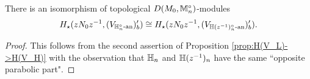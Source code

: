 \documentclass[10pt]{amsart}
\begin{document}
\begin{proposition}\label{prop:Hecke_isom}
There is an isomorphism of topological $D(M_{0},\mathbb{M}_{n}^{\circ})$-modules \[
    H_{\star}(zN_{0}z^{-1},(V_{\mathbb{H}_{n}^{\circ}\textnormal{-an}})^{\prime}_{b}) \cong H_{\star}(zN_{0}z^{-1},(V_{\mathbb{H}(z^{-1})_{n}^{\circ}\textnormal{-an}})^{\prime}_{b}).
\]
\end{proposition}
\begin{proof}
This follows from the second assertion of Proposition \ref{prop:H(V_L)->H(V_H)} with the observation that $\mathbb{H}_{n}$ and $\mathbb{H}(z^{-1})_{n}$ have the same ``opposite parabolic part". 
\end{proof}

\end{document}
